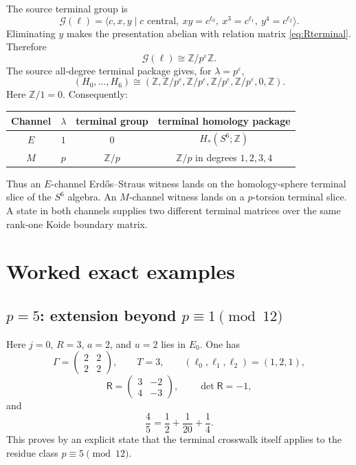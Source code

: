 \documentclass[11pt]{article}
\theoremstyle{definition}
\theoremstyle{remark}
\newcommand{\Z}{\mathbb Z}
\begin{document}
The source terminal group is
\begin{equation}\label{eq:terminal-group}
 \mathcal G(\ell)=
 \langle c,x,y\mid c\text{ central},\ xy=c^{\ell_0},\
 x^3=c^{\ell_1},\ y^4=c^{\ell_2}\rangle.
\end{equation}
Eliminating $y$ makes the presentation abelian with relation matrix
\eqref{eq:Rterminal}.  Therefore
\begin{equation}\label{eq:group-outcome}
 \mathcal G(\ell)\cong\Z/p^\varepsilon\Z.
\end{equation}
The source all-degree terminal package gives, for $\lambda=p^\varepsilon$,
\begin{equation}\label{eq:homology-package}
 (H_0,\ldots,H_6)
 \cong
 \left(
 \Z,\Z/p^\varepsilon,\Z/p^\varepsilon,
 \Z/p^\varepsilon,\Z/p^\varepsilon,0,\Z
 \right).
\end{equation}
Here $\Z/1=0$.  Consequently:
\begin{center}
\begin{tabular}{c c c c}
\toprule
Channel & $\lambda$ & terminal group & terminal homology package\\
\midrule
$E$ & $1$ & $0$ & $H_*(S^6;\Z)$\\
$M$ & $p$ & $\Z/p$ & $\Z/p$ in degrees $1,2,3,4$\\
\bottomrule
\end{tabular}
\end{center}

Thus an $E$-channel Erd\H{o}s--Straus witness lands on the homology-sphere
terminal slice of the $S^6$ algebra.  An $M$-channel witness lands on a
$p$-torsion terminal slice.  A state in both channels supplies two different
terminal matrices over the same rank-one Koide boundary matrix.

\section{Worked exact examples}

\subsection{\texorpdfstring{$p=5$: extension beyond $p\equiv1\pmod{12}$}{p=5: extension beyond p=1 mod 12}}
Here $j=0$, $R=3$, $a=2$, and $u=2$ lies in $E_0$.  One has
\[
 \Gamma=\begin{pmatrix}2&2\\2&2\end{pmatrix},
 \qquad
 T=3,
 \qquad
 (\ell_0,\ell_1,\ell_2)=(1,2,1),
\]
\[
 \mathsf R=\begin{pmatrix}3&-2\\4&-3\end{pmatrix},
 \qquad
 \det\mathsf R=-1,
\]
and
\[
 \frac45=\frac12+\frac1{20}+\frac14.
\]
This proves by an explicit state that the terminal crosswalk itself applies to
the residue class $p\equiv5\pmod{12}$.
\end{document}
